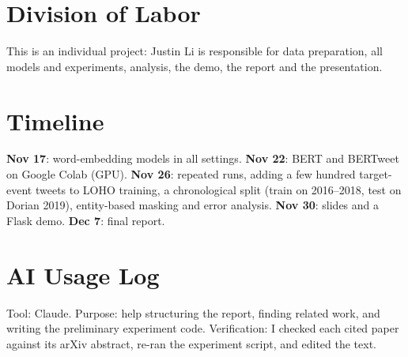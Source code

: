 \documentclass[11pt,a4paper]{article}
\begin{document}
\section{Division of Labor}

This is an individual project: Justin Li is responsible for data preparation, all models and experiments, analysis, the demo, the report and the presentation.

\section{Timeline}

\textbf{Nov 17}: word-embedding models in all settings. \textbf{Nov 22}: BERT and BERTweet on Google Colab (GPU). \textbf{Nov 26}: repeated runs, adding a few hundred target-event tweets to LOHO training, a chronological split (train on 2016--2018, test on Dorian 2019), entity-based masking and error analysis. \textbf{Nov 30}: slides and a Flask demo. \textbf{Dec 7}: final report.

\section*{AI Usage Log}
Tool: Claude. Purpose: help structuring the report, finding related work, and writing the preliminary experiment code. Verification: I checked each cited paper against its arXiv abstract, re-ran the experiment script, and edited the text.



\end{document}

